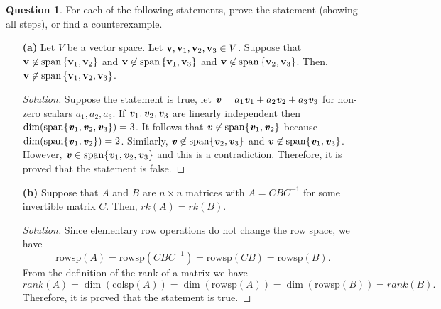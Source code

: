 \documentclass{article}
\renewcommand{\v}{{\bf v}}
\theoremstyle{definition}
\newtheorem{question}{Question}
\newcommand{\vt}[1]{\textbf{\textit{#1}}}
\newcommand{\0}{\textbf{0}}
\begin{document}
\begin{question} For each of the following statements, prove the statement (showing all steps), or find a counterexample.

\vspace{.25cm}

\begin{enumerate}

\item[{\bf (a)}] Let $V$ be a vector space. Let $\v, \v_1,\v_2,\v_3\in V$. Suppose that $\v \not\in \mathrm{span}\left\{\v_1,\v_2\right\}$ and $\v \not\in \mathrm{span}\left\{\v_1,\v_3\right\}$ and $\v \not\in \mathrm{span}\left\{\v_2,\v_3\right\}$. Then, $\v \not\in \mathrm{span}\left\{\v_1,\v_2,\v_3\right\}$.

\begin{proof}[Solution]
    Suppose the statement is true, let \(\vt{v}=a_1\vt{v}_1+a_2\vt{v}_2+a_3\vt{v}_3\) for non-zero scalars \(a_1, a_2, a_3\).
    If \(\vt{v}_1, \vt{v}_2, \vt{v}_3\) are linearly independent then \(\dim(\mathrm{span}\{\vt{v}_1, \vt{v}_2, \vt{v}_3\})=3\).
    It follows that \(\vt{v}\not\in\mathrm{span}\{\vt{v}_1, \vt{v}_2\}\) because \(\dim(\mathrm{span}\{\vt{v}_1, \vt{v}_2\})=2\).
    Similarly, \(\vt{v}\not\in\mathrm{span}\{\vt{v}_2, \vt{v}_3\}\) and \(\vt{v}\not\in\mathrm{span}\{\vt{v}_1, \vt{v}_3\}\).
    However, \(\vt{v}\in\mathrm{span}\{\vt{v}_1, \vt{v}_2, \vt{v}_3\}\) and this is a contradiction.
    Therefore, it is proved that the statement is false.
\end{proof}

\vspace{.25cm}

\item[{\bf (b)}] Suppose that $A$ and $B$ are $n\times n$ matrices with $A = CBC^{-1}$ for some invertible matrix $C$. Then, $rk(A) = rk(B)$.

\begin{proof}[Solution]
    Since elementary row operations do not change the row space, we have
    \[\mathrm{rowsp}(A)=\mathrm{rowsp}(CBC^{-1})=\mathrm{rowsp}(CB)=\mathrm{rowsp}(B).\]
    From the definition of the rank of a matrix we have
    \[rank(A)=\dim(\mathrm{colsp}(A))=\dim(\mathrm{rowsp}(A))=\dim(\mathrm{rowsp}(B))=rank(B).\]
    Therefore, it is proved that the statement is true.
\end{proof}

\vspace{.25cm}


\end{enumerate}
\end{question}
\end{document}
